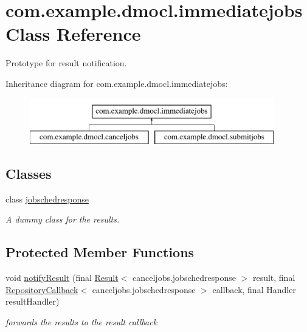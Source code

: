 \hypertarget{classcom_1_1example_1_1dmocl_1_1immediatejobs}{}\section{com.\+example.\+dmocl.\+immediatejobs Class Reference}
\label{classcom_1_1example_1_1dmocl_1_1immediatejobs}


Prototype for result notification.  


Inheritance diagram for com.\+example.\+dmocl.\+immediatejobs\+:\begin{figure}[H]
\begin{center}
\leavevmode
\includegraphics[height=2.000000cm]{classcom_1_1example_1_1dmocl_1_1immediatejobs}
\end{center}
\end{figure}
\subsection*{Classes}
\begin{DoxyCompactItemize}
\item 
class \mbox{\hyperlink{classcom_1_1example_1_1dmocl_1_1immediatejobs_1_1jobschedresponse}{jobschedresponse}}
\begin{DoxyCompactList}\small\item\em A dummy class for the results. \end{DoxyCompactList}\end{DoxyCompactItemize}
\subsection*{Protected Member Functions}
\begin{DoxyCompactItemize}
\item 
void \mbox{\hyperlink{classcom_1_1example_1_1dmocl_1_1immediatejobs_a5b2d3120e14b08e5712a4bce8728b60d}{notify\+Result}} (final \mbox{\hyperlink{classcom_1_1example_1_1dmocl_1_1Result}{Result}}$<$ canceljobs.\+jobschedresponse $>$ result, final \mbox{\hyperlink{interfacecom_1_1example_1_1dmocl_1_1RepositoryCallback}{Repository\+Callback}}$<$ canceljobs.\+jobschedresponse $>$ callback, final Handler result\+Handler)
\begin{DoxyCompactList}\small\item\em forwards the results to the result callback \end{DoxyCompactList}\end{DoxyCompactItemize}


